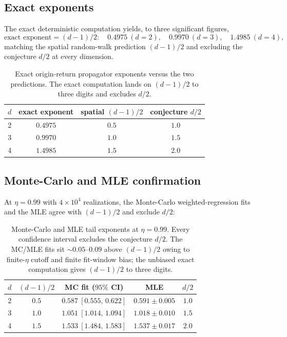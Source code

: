 \documentclass[11pt,a4paper]{article}
\begin{document}
\subsection{Exact exponents}

The exact deterministic computation yields, to three significant figures,
\begin{equation}
\text{exact exponent} = (d-1)/2 :\quad 0.4975\ (d{=}2),\quad 0.9970\ (d{=}3),\quad 1.4985\ (d{=}4),
\end{equation}
matching the spatial random-walk prediction $(d-1)/2$ and excluding the conjecture $d/2$ at every dimension.

\begin{table}[h]
\centering
\begin{tabular}{cccc}
\toprule
$d$ & exact exponent & spatial $(d-1)/2$ & conjecture $d/2$ \\
\midrule
2 & $\mathbf{0.4975}$ & $0.5$ & $1.0$ \\
3 & $\mathbf{0.9970}$ & $1.0$ & $1.5$ \\
4 & $\mathbf{1.4985}$ & $1.5$ & $2.0$ \\
\bottomrule
\end{tabular}
\caption{Exact origin-return propagator exponents versus the two predictions. The exact computation lands on $(d-1)/2$ to three digits and excludes $d/2$.}
\end{table}

\subsection{Monte-Carlo and MLE confirmation}

At $\eta=0.99$ with $4\times10^4$ realizations, the Monte-Carlo weighted-regression fits and the MLE agree with $(d-1)/2$ and exclude $d/2$:

\begin{table}[h]
\centering
\begin{tabular}{ccccc}
\toprule
$d$ & $(d-1)/2$ & MC fit ($95\%$ CI) & MLE & $d/2$ \\
\midrule
2 & $0.5$ & $0.587\ [0.555,\,0.622]$ & $0.591\pm0.005$ & $1.0$ \\
3 & $1.0$ & $1.051\ [1.014,\,1.094]$ & $1.018\pm0.010$ & $1.5$ \\
4 & $1.5$ & $1.533\ [1.484,\,1.583]$ & $1.537\pm0.017$ & $2.0$ \\
\bottomrule
\end{tabular}
\caption{Monte-Carlo and MLE tail exponents at $\eta=0.99$. Every confidence interval excludes the conjecture $d/2$. The MC/MLE fits sit $\sim0.05$--$0.09$ above $(d-1)/2$ owing to finite-$\eta$ cutoff and finite fit-window bias; the unbiased exact computation gives $(d-1)/2$ to three digits.}
\end{table}
\end{document}
